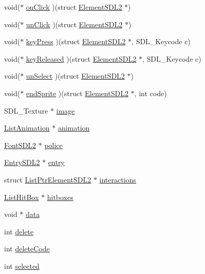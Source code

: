 \begin{DoxyCompactItemize}
void($\ast$ \hyperlink{structElementSDL2_ae56c022599e2e8acdda29fbb8af44942}{on\+Click} )(struct \hyperlink{structElementSDL2}{Element\+S\+D\+L2} $\ast$)
\item 
void($\ast$ \hyperlink{structElementSDL2_a0ad4094686063db36244b474fe42a336}{un\+Click} )(struct \hyperlink{structElementSDL2}{Element\+S\+D\+L2} $\ast$)
\item 
void($\ast$ \hyperlink{structElementSDL2_aff1dc935700d44a0ef0d53de7cca9d41}{key\+Press} )(struct \hyperlink{structElementSDL2}{Element\+S\+D\+L2} $\ast$, S\+D\+L\+\_\+\+Keycode c)
\item 
void($\ast$ \hyperlink{structElementSDL2_a76ecf85adcb072db772a8351ea7e04ee}{key\+Released} )(struct \hyperlink{structElementSDL2}{Element\+S\+D\+L2} $\ast$, S\+D\+L\+\_\+\+Keycode c)
\item 
void($\ast$ \hyperlink{structElementSDL2_a8057ee0d19cdd60ec568076206ee0e12}{un\+Select} )(struct \hyperlink{structElementSDL2}{Element\+S\+D\+L2} $\ast$)
\item 
void($\ast$ \hyperlink{structElementSDL2_aa857e06629320966e80bd437050b07e8}{end\+Sprite} )(struct \hyperlink{structElementSDL2}{Element\+S\+D\+L2} $\ast$, int code)
\item 
S\+D\+L\+\_\+\+Texture $\ast$ \hyperlink{structElementSDL2_aab2ff0fd3a1c4370d7f1f9cdd250d056}{image}
\item 
\hyperlink{structListAnimation}{List\+Animation} $\ast$ \hyperlink{structElementSDL2_a9b7927abbd7b67f843758ff65436fbb5}{animation}
\item 
\hyperlink{structFontSDL2}{Font\+S\+D\+L2} $\ast$ \hyperlink{structElementSDL2_a785d4fada0ba0ac6b5ce7a53c379f8cd}{police}
\item 
\hyperlink{structEntrySDL2}{Entry\+S\+D\+L2} $\ast$ \hyperlink{structElementSDL2_a9c99c1c34dcf0e52baaca7a64598bd8a}{entry}
\item 
struct \hyperlink{structListPtrElementSDL2}{List\+Ptr\+Element\+S\+D\+L2} $\ast$ \hyperlink{structElementSDL2_aca39f22199862196fc52dfcecafeca4a}{interactions}
\item 
\hyperlink{structListHitBox}{List\+Hit\+Box} $\ast$ \hyperlink{structElementSDL2_aa4af7ab8949d93544da609659a4011c0}{hitboxes}
\item 
void $\ast$ \hyperlink{structElementSDL2_abca7de78cc7e420d98d24a955563c7cc}{data}
\item 
int \hyperlink{structElementSDL2_a59d6b7086533d8d7da883bc882c4ef6d}{delete}
\item 
int \hyperlink{structElementSDL2_a1f8620d697afd711263d20dd82077cd0}{delete\+Code}
\item 
int \hyperlink{structElementSDL2_a2cae92fe5dd207db485261128b82bc02}{selected}
\end{DoxyCompactItemize}


